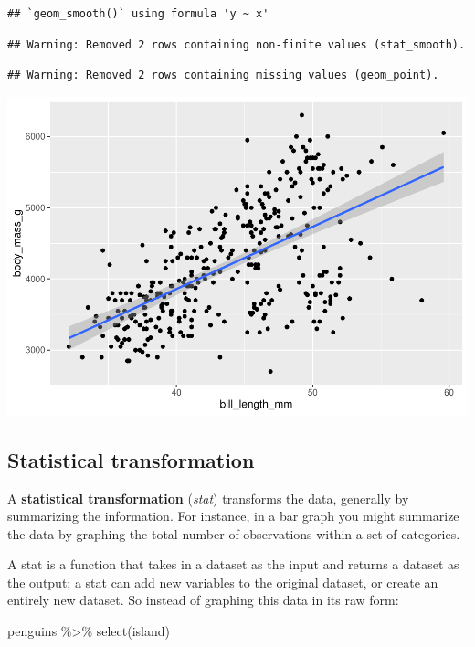 \documentclass[
]{article}
\newenvironment{Shaded}{\begin{snugshade}}{\end{snugshade}}
\newcommand{\FunctionTok}[1]{\textcolor[rgb]{0.00,0.00,0.00}{#1}}
\newcommand{\NormalTok}[1]{#1}
\newcommand{\SpecialCharTok}[1]{\textcolor[rgb]{0.00,0.00,0.00}{#1}}
\begin{document}
\begin{verbatim}
## `geom_smooth()` using formula 'y ~ x'
\end{verbatim}

\begin{verbatim}
## Warning: Removed 2 rows containing non-finite values (stat_smooth).
\end{verbatim}

\begin{verbatim}
## Warning: Removed 2 rows containing missing values (geom_point).
\end{verbatim}

\includegraphics{Grammar-of-Graphics_files/figure-latex/mapping-1.pdf}

\hypertarget{statistical-transformation}{%
\subsection{Statistical
transformation}\label{statistical-transformation}}

A \textbf{statistical transformation} (\emph{stat}) transforms the data,
generally by summarizing the information. For instance, in a bar graph
you might summarize the data by graphing the total number of
observations within a set of categories.

A stat is a function that takes in a dataset as the input and returns a
dataset as the output; a stat can add new variables to the original
dataset, or create an entirely new dataset. So instead of graphing this
data in its raw form:

\begin{Shaded}
\begin{Highlighting}[]
\NormalTok{penguins }\SpecialCharTok{\%\textgreater{}\%}
  \FunctionTok{select}\NormalTok{(island)}
\end{Highlighting}
\end{Shaded}
\end{document}
